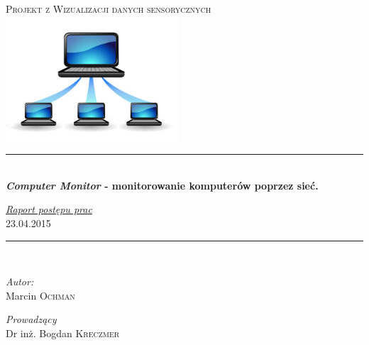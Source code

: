 \begin{titlepage}
\begin{center}

 \newcommand{\HRule}{\rule{\linewidth}{0.5mm}}

\textsc{\Large Projekt z Wizualizacji danych sensorycznych}\\[1cm]

\includegraphics{network_icon}


\HRule \\[0.4cm]
{ \huge \bfseries \textit{Computer Monitor} - monitorowanie komputerów poprzez sieć.\\[0.4cm] }

{\huge \underline{\textit{Raport postępu prac }}}\\[0.5cm]


\LARGE 23.04.2015
\HRule \\[1.5cm]


\noindent
\begin{minipage}[t]{0.4\textwidth}
\begin{flushleft} \large
\emph{Autor:}\\
Marcin \textsc{Ochman}
\end{flushleft}
\end{minipage}%
\begin{minipage}[t]{0.4\textwidth}
\begin{flushright} \large
\emph{Prowadzący} \\
Dr inż. Bogdan \textsc{Kreczmer}
\end{flushright}
\end{minipage}


\end{center}
\end{titlepage}